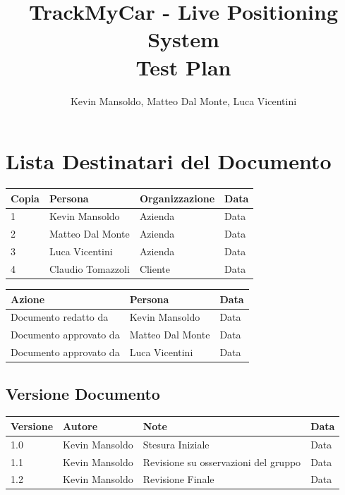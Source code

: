 \documentclass[a4paper,12pt]{article}
\begin{document}
\title{\textbf{TrackMyCar - Live Positioning System} \\ Test Plan}

\author{Kevin Mansoldo, Matteo Dal Monte, Luca Vicentini}
\date{}
\maketitle
\pagebreak

\tableofcontents
\pagebreak

\section{Lista Destinatari del Documento}

\begin{table}[ht]
\begin{center}
\begin{tabular}{p{1cm} p{4.5cm} p{5cm} p{2cm}}
\rowcolor{Ash}
\hline
Copia & Persona & Organizzazione & Data \\ \hline
1 & Kevin Mansoldo & Azienda & Data \\ 
2 & Matteo Dal Monte & Azienda & Data \\ 
3 & Luca Vicentini & Azienda & Data \\ 
4 & Claudio Tomazzoli & Cliente & Data \\ \hline
\end{tabular}
\end{center}


\begin{center}
\begin{tabular}{p{6cm} p{5cm} p{2cm}}
\rowcolor{Ash}
\hline
Azione & Persona & Data \\ \hline
Documento redatto da & Kevin Mansoldo & Data \\ 
Documento approvato da & Matteo Dal Monte & Data \\ 
Documento approvato da & Luca Vicentini & Data \\ \hline
\end{tabular}
\end{center}
\end{table}

\subsection{Versione Documento}
\begin{table}[ht]
\begin{center}
\begin{tabular}{p{1cm} p{4.5cm} p{5cm} p{2cm}}
\rowcolor{Ash}
\hline
Versione & Autore & Note & Data \\ \hline
1.0 & Kevin Mansoldo & Stesura Iniziale & Data \\ 
1.1 & Kevin Mansoldo & Revisione su osservazioni del gruppo & Data \\ 
1.2 & Kevin Mansoldo & Revisione Finale & Data \\ \hline
\end{tabular}
\end{center}
\end{table}
\end{document}
